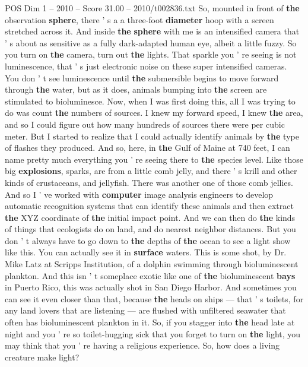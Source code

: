 \begin{textsample}{POS Dim 1 – 2010 – Score 31.00 – 2010/t002836.txt}
So, mounted in front of \textbf{the} observation \textbf{sphere}, there ' s a a three-foot \textbf{diameter} hoop with a screen stretched across it.
And inside \textbf{the} \textbf{sphere} with me is an intensified camera that ' s about as sensitive as a fully dark-adapted human eye, albeit a little fuzzy.
So you turn on \textbf{the} camera, turn out \textbf{the} lights.
That sparkle you ' re seeing is not luminescence, that ' s just electronic noise on these super intensified cameras.
You don ' t see luminescence until \textbf{the} submersible begins to move forward through \textbf{the} water, but as it does, animals bumping into \textbf{the} screen are stimulated to bioluminesce.
Now, when I was first doing this, all I was trying to do was count \textbf{the} numbers of sources.
I knew my forward speed, I knew \textbf{the} area, and so I could figure out how many hundreds of sources there were per cubic meter.
But I started to realize that I could actually identify animals by \textbf{the} type of flashes they produced.
And so, here, in \textbf{the} Gulf of Maine at 740 feet, I can name pretty much everything you ' re seeing there to \textbf{the} species level.
Like those big \textbf{explosions}, sparks, are from a little comb jelly, and there ' s krill and other kinds of crustaceans, and jellyfish.
There was another one of those comb jellies.
And so I ' ve worked with \textbf{computer} image analysis engineers to develop automatic recognition systems that can identify these animals and then extract \textbf{the} XYZ coordinate of \textbf{the} initial impact point.
And we can then do \textbf{the} kinds of things that ecologists do on land, and do nearest neighbor distances.
But you don ' t always have to go down to \textbf{the} depths of \textbf{the} ocean to see a light show like this.
You can actually see it in \textbf{surface} waters.
This is some shot, by Dr.
Mike Latz at Scripps Institution, of a dolphin swimming through bioluminescent plankton.
And this isn ' t someplace exotic like one of \textbf{the} bioluminescent \textbf{bays} in Puerto Rico, this was actually shot in San Diego Harbor.
And sometimes you can see it even closer than that, because \textbf{the} heads on ships — that ' s toilets, for any land lovers that are listening — are flushed with unfiltered seawater that often has bioluminescent plankton in it.
So, if you stagger into \textbf{the} head late at night and you ' re so toilet-hugging sick that you forget to turn on \textbf{the} light, you may think that you ' re having a religious experience.
So, how does a living creature make light?

\end{textsample}
